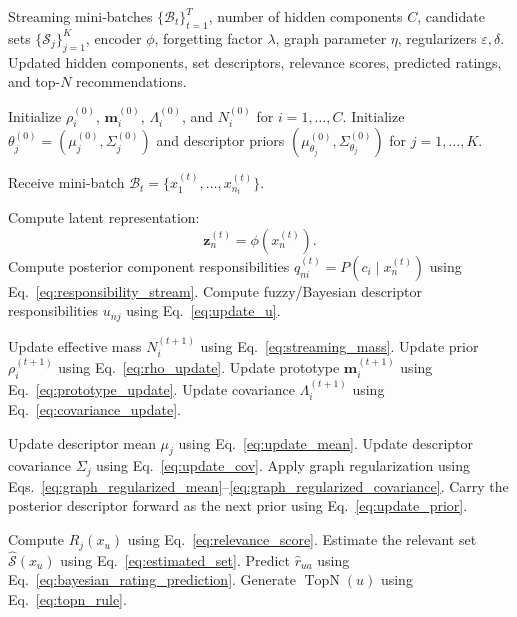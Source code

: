 \documentclass{article}
\theoremstyle{plain}
\theoremstyle{definition}
\theoremstyle{remark}
\begin{document}
\begin{algorithm}[H]
	\caption{Bayesian Latent Filtering for Streaming Recommendation}
	\label{alg:bayesian_latent_filtering}
	\begin{algorithmic}[1]
		\REQUIRE Streaming mini-batches \(\{\mathcal B_t\}_{t=1}^{T}\), number of hidden components \(C\), candidate sets \(\{\mathcal S_j\}_{j=1}^{K}\), encoder \(\phi\), forgetting factor \(\lambda\), graph parameter \(\eta\), regularizers \(\varepsilon,\delta\).
		\ENSURE Updated hidden components, set descriptors, relevance scores, predicted ratings, and top-\(N\) recommendations.
		
		\STATE Initialize \(\rho_i^{(0)}\), \(\mathbf m_i^{(0)}\), \(\Lambda_i^{(0)}\), and \(N_i^{(0)}\) for \(i=1,\ldots,C\).
		\STATE Initialize \(\theta_j^{(0)}=(\mu_j^{(0)},\Sigma_j^{(0)})\) and descriptor priors \((\mu_{\theta_j}^{(0)},\Sigma_{\theta_j}^{(0)})\) for \(j=1,\ldots,K\).
		
		\STATE Receive mini-batch \(\mathcal B_t=\{x_1^{(t)},\ldots,x_{n_t}^{(t)}\}\).
		
		\STATE Compute latent representation:
		\[
		\mathbf z_n^{(t)}=\phi(x_n^{(t)}).
		\]
		\STATE Compute posterior component responsibilities \(q_{ni}^{(t)}=P(c_i\mid x_n^{(t)})\) using Eq.~\eqref{eq:responsibility_stream}.
		\STATE Compute fuzzy/Bayesian descriptor responsibilities \(u_{nj}\) using Eq.~\eqref{eq:update_u}.
		\ENDFOR
		
		\STATE Update effective mass \(N_i^{(t+1)}\) using Eq.~\eqref{eq:streaming_mass}.
		\STATE Update prior \(\rho_i^{(t+1)}\) using Eq.~\eqref{eq:rho_update}.
		\STATE Update prototype \(\mathbf m_i^{(t+1)}\) using Eq.~\eqref{eq:prototype_update}.
		\STATE Update covariance \(\Lambda_i^{(t+1)}\) using Eq.~\eqref{eq:covariance_update}.
		\ENDFOR
		
		\STATE Update descriptor mean \(\mu_j\) using Eq.~\eqref{eq:update_mean}.
		\STATE Update descriptor covariance \(\Sigma_j\) using Eq.~\eqref{eq:update_cov}.
		\STATE Apply graph regularization using Eqs.~\eqref{eq:graph_regularized_mean}--\eqref{eq:graph_regularized_covariance}.
		\STATE Carry the posterior descriptor forward as the next prior using Eq.~\eqref{eq:update_prior}.
		\ENDFOR
		
		\STATE Compute \(R_j(x_u)\) using Eq.~\eqref{eq:relevance_score}.
		\STATE Estimate the relevant set \(\widehat{\mathcal S}(x_u)\) using Eq.~\eqref{eq:estimated_set}.
		\STATE Predict \(\widehat r_{ua}\) using Eq.~\eqref{eq:bayesian_rating_prediction}.
		\STATE Generate \(\operatorname{TopN}(u)\) using Eq.~\eqref{eq:topn_rule}.
		\ENDFOR
		\ENDFOR
	\end{algorithmic}
\end{algorithm}
\end{document}
